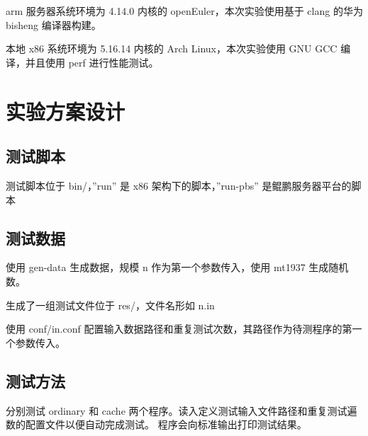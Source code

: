 \documentclass[a4paper]{article}
\begin{document}
arm 服务器系统环境为 4.14.0 内核的 openEuler，本次实验使用基于 clang 的华为 bisheng 编译器构建。

本地 x86 系统环境为 5.16.14 内核的 Arch Linux，本次实验使用 GNU GCC 编译，并且使用 perf 进行性能测试。

\section{实验方案设计}
\subsection{测试脚本}
测试脚本位于 bin/，''run'' 是 x86 架构下的脚本，''run-pbs'' 是鲲鹏服务器平台的脚本

\subsection{测试数据}
使用 gen-data 生成数据，规模 n 作为第一个参数传入，使用 mt1937 生成随机数。

生成了一组测试文件位于 res/，文件名形如 n.in

使用 conf/in.conf 配置输入数据路径和重复测试次数，其路径作为待测程序的第一个参数传入。

\subsection{测试方法}
分别测试 ordinary 和 cache 两个程序。读入定义测试输入文件路径和重复测试遍数的配置文件以便自动完成测试。
程序会向标准输出打印测试结果。
\end{document}
